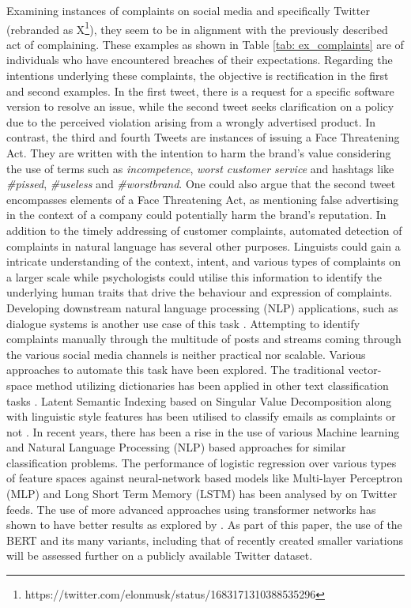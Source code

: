 Examining instances of complaints on social media and specifically Twitter (rebranded as X\footnote{https://twitter.com/elonmusk/status/1683171310388535296}), they seem to be in alignment with the previously described act of complaining. These examples as shown in Table \ref{tab: ex_complaints} are of individuals who have encountered breaches of their expectations. Regarding the intentions underlying these complaints, the objective is rectification in the first and second examples. In the first tweet, there is a request for a specific software version to resolve an issue, while the second tweet seeks clarification on a policy due to the perceived violation arising from a wrongly advertised product. In contrast, the third and fourth Tweets are instances of issuing a Face Threatening Act. They are written with the intention to harm the brand's value considering the use of terms such as \textit{incompetence}, \textit{worst customer service} and hashtags like \textit{\#pissed}, \textit{\#useless} and \textit{\#worstbrand}. One could also argue that the second tweet encompasses elements of a Face Threatening Act, as mentioning false advertising in the context of a company could potentially harm the brand's reputation.
\newline \newline
In addition to the timely addressing of customer complaints, automated detection of complaints in natural language has several other purposes. Linguists could gain a intricate understanding of the context, intent, and various types of complaints on a larger scale while psychologists could utilise this information to identify the underlying human traits that drive the behaviour and expression of complaints. Developing downstream natural language processing (NLP) applications, such as dialogue systems is another use case of this task \cite{preotiuc-pietro_automatically_2019}.
\newline \newline
Attempting to identify complaints manually through the multitude of posts and streams coming through the various social media channels is neither practical nor scalable. Various approaches to automate this task have been explored. The traditional vector-space method utilizing dictionaries has been applied in other text classification tasks \cite{liang_dictionary-based_2006}. Latent Semantic Indexing based on Singular Value Decomposition along with linguistic style features has been utilised to classify emails as complaints or not \cite{coussement_improving_2008}. In recent years, there has been a rise in the use of various Machine learning and Natural Language Processing (NLP) based approaches for similar classification problems. The performance of logistic regression over various types of feature spaces against neural-network based models like Multi-layer Perceptron (MLP) and Long Short Term Memory (LSTM) has been analysed by \cite{preotiuc-pietro_automatically_2019} on Twitter feeds. The use of more advanced approaches using transformer networks has shown to have better results as explored by \cite{jin_complaint_2020}. As part of this paper, the use of the BERT and its many variants, including that of recently created smaller variations will be assessed further on a publicly available Twitter dataset.

